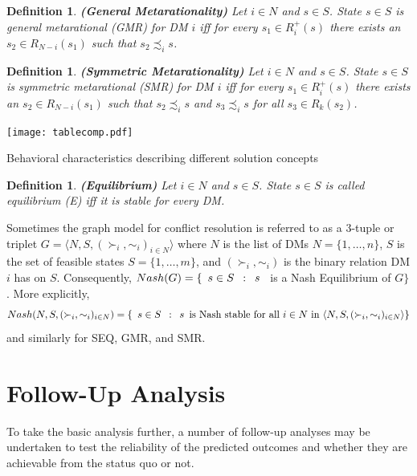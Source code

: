 \documentclass[letterpaper,12pt,titlepage,oneside,final]{book}
\newtheorem{definition}[lemma]{Definition}
\begin{document}
\begin{definition}
\rm {\bf (General Metarationality)} Let $i \in N$ and $s \in
S$. State $s \in S$ is \emph{general metarational} (\emph{GMR}) for DM $i$ \emph{iff} for every $s_1 \in R_i^+(s)$ there exists an $s_2 \in
R_{N-i}(s_1)$ such that $s_2 \precsim_i s$.
\end{definition}

\begin{definition}
\rm {\bf (Symmetric Metarationality)}  Let $i \in N$ and $s \in
S$. State $s \in S$ is \emph{symmetric metarational} (\emph{SMR}) for DM $i$ \emph{iff} for every $s_1 \in R_i^+(s)$ there exists an $s_2 \in
R_{N-i}(s_1)$ such that $s_2 \precsim_i s$ and $s_3 \precsim_i s$
for all $s_3 \in R_k(s_2)$.
\end{definition}

\begin{table}[H]
\centering
\texttt{[image: tablecomp.pdf]}

\caption{Behavioral characteristics describing different solution concepts}

\label{tbl:behchar}
\end{table}

\begin{definition}
\rm {\bf (Equilibrium)}  Let $i \in N$ and $s \in
S$. State $s \in S$ is called \emph{equilibrium} (\emph{E}) \emph{iff} it is stable for every DM.
\end{definition}

Sometimes the graph model for conflict resolution is referred to as a 3-tuple or triplet $G=\langle N,S,(\succ_i,\sim_i)_{i\in N}\rangle$ where $N$ is the list of DMs $N=\{1,\dots ,n\}$, $S$ is the set of feasible states $S=\{1,\dots ,m\}$, and $(\succ_i,\sim_i)$ is the binary relation DM $i$ has on $S$. Consequently, $Nash(G)=\{ \enskip s \in S \enskip : \enskip s \enskip$  is a Nash Equilibrium of $G \}$. More explicitly, $$Nash(N,S,(\succ_i,\sim_i)_{i\in N})=\{ \enskip s \in S \enskip : \enskip s \enskip  \text{is Nash stable for all } i \in N \text{ in } \langle N,S,(\succ_i,\sim_i)_{i\in N}\rangle \}$$ and similarly for SEQ, GMR, and SMR.


\section{Follow-Up Analysis}

To take the basic analysis further, a number of follow-up analyses may be undertaken to test the reliability of the predicted outcomes and whether they are achievable from the status quo or not.
\end{document}
